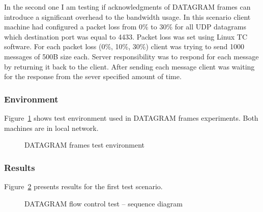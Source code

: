 In the second one I am testing if acknowledgments of DATAGRAM frames can introduce a significant overhead to the bandwidth usage.
In this scenario client machine had configured a packet loss from 0\% to 30\% for all UDP datagrams which destination port was equal to 4433.
Packet loss was set using Linux TC software.
For each packet loss (0\%, 10\%, 30\%) client was trying to send 1000 messages of 500B size each.
Server responsibility was to respond for each message by returning it back to the client.
After sending each message client was waiting for the response from the sever specified amount of time.

\subsubsection{Environment}
\label{subsubsec:test-env}
Figure~\ref{fig:dgram-test-env} shows test environment used in DATAGRAM frames experiments.
Both machines are in local network.

\begin{figure}[h]
    \centering
    \caption{DATAGRAM frames test environment}
    \label{fig:dgram-test-env}
\end{figure}

\subsubsection{Results}
Figure~\ref{fig:dgram_flow_control} presents results for the first test scenario.


\begin{figure}[h]
    \centering
    \begin{sequencediagram}
    \end{sequencediagram}
    \caption{DATAGRAM flow control test -- sequence diagram}
    \label{fig:dgram_flow_control}
\end{figure}



